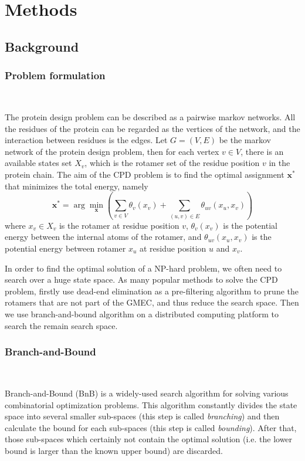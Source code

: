 \section{Methods}
\subsection{Background}

\subsubsection{Problem formulation}\

\noindent The protein design problem can be described as a pairwise markov networks. All the residues of the protein can be regarded as the vertices of the network, and the interaction between residues is the edges. Let $G=(V,E)$ be the markov network of the protein design problem, then for each vertex $v\in V$, there is an available states set $X_v$, which is the rotamer set of the residue position $v$ in the protein chain. The aim of the CPD problem is to find the optimal assignment $\mathbf{x^*}$ that minimizes the total energy, namely
\[ \mathbf{x^*} = \arg\min_{\mathbf{x}}\left(\sum_{v\in V}\theta_v(x_v) + \sum_{(u,v)\in E}\theta_{uv}(x_u,x_v)\right) \]
where $x_v\in X_v$ is the rotamer at residue position $v$, $\theta_v(x_v)$ is the potential energy between the internal atoms of the rotamer, and $\theta_{uv}(x_u,x_v)$ is the potential energy between rotamer $x_u$ at residue position $u$ and $x_v$.

In order to find the optimal solution of a NP-hard problem, we often need to search over a huge state space. As many popular methods to solve the CPD problem, firstly use dead-end elimination as a pre-filtering algorithm to prune the rotamers that are not part of the GMEC, and thus reduce the search space. Then we use branch-and-bound algorithm on a distributed computing platform to search the remain search space.

\subsubsection{Branch-and-Bound}\

\noindent Branch-and-Bound (BnB) is a widely-used search algorithm for solving various combinatorial optimization problems. This algorithm constantly divides the state space into several smaller sub-spaces (this step is called \textit{branching}) and then calculate the bound for each sub-spaces (this step is called \textit{bounding}). After that, those sub-spaces which certainly not contain the optimal solution (i.e. the lower bound is larger than the known upper bound) are discarded.

